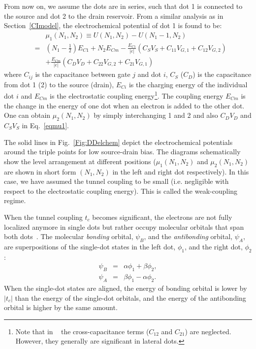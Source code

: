 \documentclass[12pt,aps,nofootinbib]{revtex4-1}
\begin{document}
From now on, we assume the dots are in series, such that dot 1 is
connected to the source and dot 2 to the drain reservoir. From a
similar analysis as in Section~\ref{CImodel}, the electrochemical
potential of dot 1 is found to be:
\begin{eqnarray}
&&\mu _{1}(N_{1},N_{2}) \equiv  U(N_{1},N_{2})-U(N_{1}-1,N_{2}) \nonumber \\
&\!\!=&\!\!\!(N_{1}\!\!-\!\!\frac{1}{2})E_{C1}\!\!+\!\!N_{2}E_{Cm}\!\!-\!\! \frac{E_{C1}}{|e|}(C_S V_S\!\!+\!\!C_{11}V_{G,1}\!\!+\!\!C_{12}V_{G,2}) \nonumber \\
&&+\frac{E_{Cm}}{|e|}(C_D V_D+C_{22}V_{G,2}+C_{21}V_{G,1})
\label{eqmu1}
\end{eqnarray}
\noindent where $C_{ij}$ is the capacitance between gate $j$ and
dot $i$, $C_{S}$ ($C_{D}$) is the capacitance from dot 1 (2) to
the source (drain), $E_{Ci}$ is the charging energy of the
individual dot $i$ and $E_{Cm}$ is the electrostatic coupling
energy\footnote{Note that in ~\textcite{WielRMP2003} the
cross-capacitance terms ($C_{12}$ and $C_{21}$) are neglected.
However, they generally are significant in lateral dots.}. The
coupling energy $E_{Cm}$ is the change in the energy of one dot
when an electron is added to the other dot. One can obtain $\mu
_{2}(N_{1},N_{2})$ by simply interchanging 1 and 2 and also $C_D
V_D$ and $C_S V_S$ in Eq.~\ref{eqmu1}.

The solid lines in Fig.~\ref{Fig:DDelchem} depict the
electrochemical potentials around the triple points for low
source-drain bias. The diagrams schematically show the level
arrangement at different positions ($\mu _{1}(N_{1},N_{2})$ and
$\mu _{2}(N_{1},N_{2})$ are shown in short form $(N_{1},N_{2})$ in
the left and right dot respectively). In this case, we have
assumed the tunnel coupling to be small (i.e. negligible with
respect to the electrostatic coupling energy). This is called the
weak-coupling regime.

When the tunnel coupling $t_c$ becomes significant, the electrons are
not fully localized anymore in single dots but rather occupy
molecular orbitals that span both dots~\cite{WielRMP2003}. The molecular \textit{bonding} orbital, $\psi_B$, and the \textit{antibonding} orbital, $\psi_A$, are superpositions of the single-dot states in the left dot, $\phi_1$, and the right dot, $\phi_2$:
\begin{eqnarray}
	\psi_B &=& \alpha \phi_1 + \beta \phi_2,\\
	\psi_A &=& \beta \phi_1 - \alpha \phi_2.
\end{eqnarray}
When the single-dot states are aligned, the energy of bonding orbital is lower by $\left| t_c \right|$ than the energy of the single-dot orbitals, and the energy of the antibonding orbital is higher by the same amount.
\end{document}
